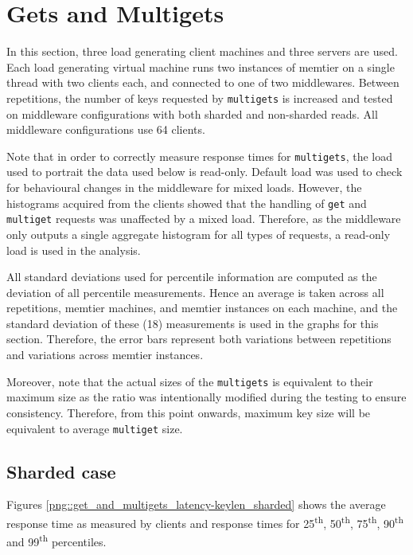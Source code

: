 \documentclass[11pt,a4paper]{article}
\begin{document}
\newpage

\section{Gets and Multigets}
In this section, three load generating client machines and three servers are used. Each load generating virtual machine runs two instances of memtier on a single thread with two clients each, and connected to one of two middlewares. Between repetitions, the number of keys requested by \texttt{multigets} is increased and tested on middleware configurations with both sharded and non-sharded reads. All middleware configurations use 64 clients.

Note that in order to correctly measure response times for \texttt{multigets}, the load used to portrait the data used below is read-only. Default load was used to check for behavioural changes in the middleware for mixed loads. However, the histograms acquired from the clients showed that the handling of \texttt{get} and \texttt{multiget} requests was unaffected by a mixed load. Therefore, as the middleware only outputs a single aggregate histogram for all types of requests, a read-only load is used in the analysis.

All standard deviations used for percentile information are computed as the deviation of all percentile measurements. Hence an average is taken across all repetitions, memtier machines, and memtier instances on each machine, and the standard deviation of these (18) measurements is used in the graphs for this section. Therefore, the error bars represent both variations between repetitions and variations across memtier instances.

Moreover, note that the actual sizes of the \texttt{multigets} is equivalent to their maximum size as the ratio was intentionally modified during the testing to ensure consistency. Therefore, from this point onwards, maximum key size will be equivalent to average \texttt{multiget} size.

\subsection{Sharded case}
Figures \ref{png::get_and_multigets_latency-keylen_sharded} shows the average response time as measured by clients and response times for 25\textsuperscript{th}, 50\textsuperscript{th}, 75\textsuperscript{th}, 90\textsuperscript{th} and 99\textsuperscript{th} percentiles.
\end{document}
